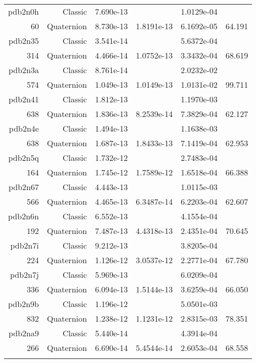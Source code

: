 \begin{xltabular}{\textwidth}{r|rS[table-format=1.3e+2]S[table-format=1.4e+2]S[table-format=1.4e+2]S[table-format=-1.3]}
pdb2n0h & Classic & 7.690e-13 &  & 1.0129e-04 & \\
60 & Quaternion & 8.730e-13 & 1.8191e-13 & 6.1692e-05 & 64.191\\  \addlinespace
pdb2n35 & Classic & 3.541e-14 &  & 5.6372e-04 & \\
314 & Quaternion & 4.466e-14 & 1.0752e-13 & 3.3432e-04 & 68.619\\  \addlinespace
pdb2n3a & Classic & 8.761e-14 &  & 2.0232e-02 & \\
574 & Quaternion & 1.049e-13 & 1.0149e-13 & 1.0131e-02 & 99.711\\  \addlinespace
pdb2n41 & Classic & 1.812e-13 &  & 1.1970e-03 & \\
638 & Quaternion & 1.836e-13 & 8.2539e-14 & 7.3829e-04 & 62.127\\  \addlinespace
pdb2n4e & Classic & 1.494e-13 &  & 1.1638e-03 & \\
638 & Quaternion & 1.687e-13 & 1.8433e-13 & 7.1419e-04 & 62.953\\  \addlinespace
pdb2n5q & Classic & 1.732e-12 &  & 2.7483e-04 & \\
164 & Quaternion & 1.745e-12 & 1.7589e-12 & 1.6518e-04 & 66.388\\  \addlinespace
pdb2n67 & Classic & 4.443e-13 &  & 1.0115e-03 & \\
566 & Quaternion & 4.465e-13 & 6.3487e-14 & 6.2203e-04 & 62.607\\  \addlinespace
pdb2n6n & Classic & 6.552e-13 &  & 4.1554e-04 & \\
192 & Quaternion & 7.487e-13 & 4.4318e-13 & 2.4351e-04 & 70.645\\  \addlinespace
pdb2n7i & Classic & 9.212e-13 &  & 3.8205e-04 & \\
224 & Quaternion & 1.126e-12 & 3.0537e-12 & 2.2771e-04 & 67.780\\  \addlinespace
pdb2n7j & Classic & 5.969e-13 &  & 6.0209e-04 & \\
336 & Quaternion & 6.094e-13 & 1.5144e-13 & 3.6259e-04 & 66.050\\  \addlinespace
pdb2n9b & Classic & 1.196e-12 &  & 5.0501e-03 & \\
832 & Quaternion & 1.238e-12 & 1.1231e-12 & 2.8315e-03 & 78.351\\  \addlinespace
pdb2na9 & Classic & 5.440e-14 &  & 4.3914e-04 & \\
266 & Quaternion & 6.690e-14 & 5.4544e-14 & 2.6053e-04 & 68.558\\  \addlinespace

\end{xltabular}

